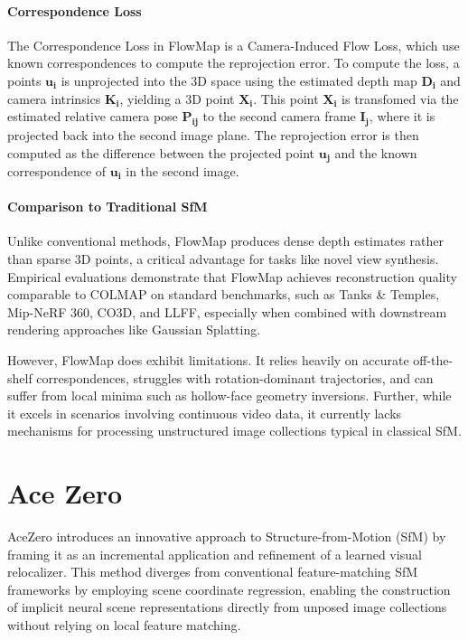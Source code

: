 \paragraph{Correspondence Loss}
The Correspondence Loss in FlowMap is a Camera-Induced Flow Loss, which use known correspondences to compute the reprojection error. 
To compute the loss, a points $\mathbf{u_i}$ is unprojected into the 3D space using the estimated depth map $\mathbf{D_i}$ and camera intrinsics $\mathbf{K_i}$, yielding a 3D point $\mathbf{X_i}$.
This point $\mathbf{X_i}$ is transfomed via the estimated relative camera pose $\mathbf{P_{ij}}$ to the second camera frame $\mathbf{I_j}$, where it is projected back into the second image plane.
The reprojection error is then computed as the difference between the projected point $\mathbf{u_j}$ and the known correspondence of $\mathbf{u_i}$ in the second image.


\paragraph{Comparison to Traditional SfM}
Unlike conventional methods, FlowMap produces dense depth estimates rather than sparse 3D points, a critical advantage for tasks like novel view synthesis. 
Empirical evaluations demonstrate that FlowMap achieves reconstruction quality comparable to COLMAP on standard benchmarks, such as Tanks \& Temples, Mip-NeRF 360, CO3D, and LLFF, especially when combined with downstream rendering approaches like Gaussian Splatting.

However, FlowMap does exhibit limitations. It relies heavily on accurate off-the-shelf correspondences, struggles with rotation-dominant trajectories, and can suffer from local minima such as hollow-face geometry inversions. 
Further, while it excels in scenarios involving continuous video data, it currently lacks mechanisms for processing unstructured image collections typical in classical SfM.


\section{Ace Zero}\label{sec:acezero}

AceZero \cite{brachmann2024acezero} introduces an innovative approach to Structure-from-Motion (SfM) by framing it as an incremental application and refinement of a learned visual relocalizer. 
This method diverges from conventional feature-matching SfM frameworks by employing scene coordinate regression, enabling the construction of implicit neural scene representations directly from unposed image collections without relying on local feature matching.

